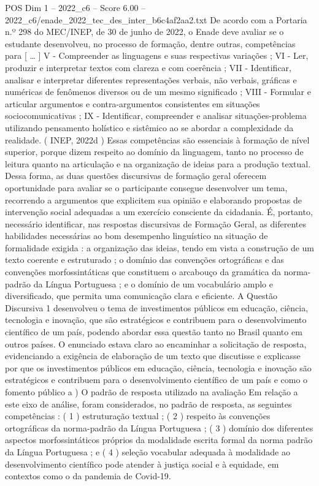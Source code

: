 \begin{textsample}{POS Dim 1 – 2022\_c6 – Score 6.00 – 2022\_c6/enade\_2022\_tec\_des\_inter\_b6c4af2aa2.txt}
De acordo com a Portaria n.º 298 do MEC/INEP, de 30 de junho de 2022, o Enade deve avaliar se o estudante desenvolveu, no processo de formação, dentre outras, competências para [ … ] V - Compreender as linguagens e suas respectivas variações ; VI - Ler, produzir e interpretar textos com clareza e com coerência ; VII - Identificar, analisar e interpretar diferentes representações verbais, não verbais, gráficas e numéricas de fenômenos diversos ou de um mesmo significado ; VIII - Formular e articular argumentos e contra-argumentos consistentes em situações sociocomunicativas ; IX - Identificar, compreender e analisar situações-problema utilizando pensamento holístico e sistêmico ao se abordar a complexidade da realidade. ( INEP, 2022d ) Essas competências são essenciais à formação de nível superior, porque dizem respeito ao domínio da linguagem, tanto no processo de leitura quanto na articulação e na organização de ideias para a produção textual.
Dessa forma, as duas questões discursivas de formação geral oferecem oportunidade para avaliar se o participante consegue desenvolver um tema, recorrendo a argumentos que explicitem sua opinião e elaborando propostas de intervenção social adequadas a um exercício consciente da cidadania.
É, portanto, necessário identificar, nas respostas discursivas de Formação Geral, as diferentes habilidades necessárias ao bom desempenho linguístico na situação de formalidade exigida : a organização das ideias, tendo em vista a construção de um texto coerente e estruturado ; o domínio das convenções ortográficas e das convenções morfossintáticas que constituem o arcabouço da gramática da norma-padrão da Língua Portuguesa ; e o domínio de um vocabulário amplo e diversificado, que permita uma comunicação clara e eficiente.
A Questão Discursiva 1 desenvolveu o tema de investimentos públicos em educação, ciência, tecnologia e inovação, que são estratégicos e contribuem para o desenvolvimento científico de um país, podendo abordar essa questão tanto no Brasil quanto em outros países.
O enunciado estava claro ao encaminhar a solicitação de resposta, evidenciando a exigência de elaboração de um texto que discutisse e explicasse por que os investimentos públicos em educação, ciência, tecnologia e inovação são estratégicos e contribuem para o desenvolvimento científico de um país e como o fomento público a ) O padrão de resposta utilizado na avaliação Em relação a este eixo de análise, foram considerados, no padrão de resposta, as seguintes competências : ( 1 ) estruturação textual ; ( 2 ) respeito às convenções ortográficas da norma-padrão da Língua Portuguesa ; ( 3 ) domínio dos diferentes aspectos morfossintáticos próprios da modalidade escrita formal da norma padrão da Língua Portuguesa ; e ( 4 ) seleção vocabular adequada à modalidade ao desenvolvimento científico pode atender à justiça social e à equidade, em contextos como o da pandemia de Covid-19.

\end{textsample}
